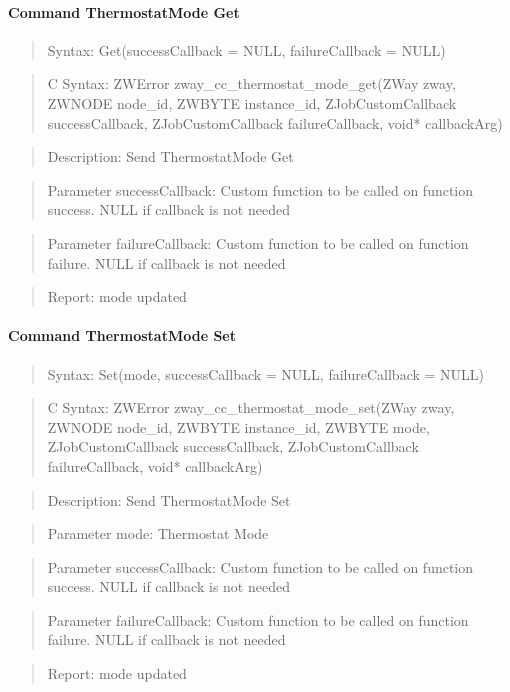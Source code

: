 \paragraph{Command ThermostatMode Get}
\begin{quote}Syntax: Get(successCallback = NULL, failureCallback = NULL)\end{quote}
\begin{quote}C Syntax: ZWError zway\_cc\_thermostat\_mode\_get(ZWay zway, ZWNODE node\_id, ZWBYTE instance\_id, ZJobCustomCallback successCallback, ZJobCustomCallback failureCallback, void* callbackArg)\end{quote}
\begin{quote}Description: Send ThermostatMode Get\end{quote}
\begin{quote}Parameter successCallback: Custom function to be called on function success. NULL if callback is not needed\end{quote}
\begin{quote}Parameter failureCallback: Custom function to be called on function failure. NULL if callback is not needed\end{quote}
\begin{quote}Report: mode updated\end{quote}

\paragraph{Command ThermostatMode Set}
\begin{quote}Syntax: Set(mode, successCallback = NULL, failureCallback = NULL)\end{quote}
\begin{quote}C Syntax: ZWError zway\_cc\_thermostat\_mode\_set(ZWay zway, ZWNODE node\_id, ZWBYTE instance\_id, ZWBYTE mode, ZJobCustomCallback successCallback, ZJobCustomCallback failureCallback, void* callbackArg)\end{quote}
\begin{quote}Description: Send ThermostatMode Set\end{quote}
\begin{quote}Parameter mode: Thermostat Mode\end{quote}
\begin{quote}Parameter successCallback: Custom function to be called on function success. NULL if callback is not needed\end{quote}
\begin{quote}Parameter failureCallback: Custom function to be called on function failure. NULL if callback is not needed\end{quote}
\begin{quote}Report: mode updated\end{quote}

